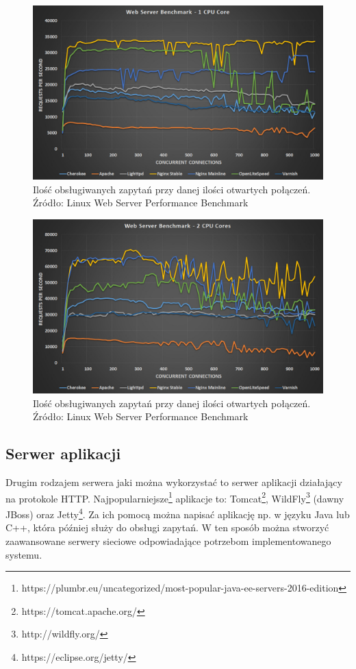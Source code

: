 \documentclass{report}
\begin{document}
			\begin{center}
				\begin{figure}[ht]
					\centering
					\includegraphics[scale=0.35]{web-server-performance-benchmark-1-cpu-core-1.jpg}
					\caption{Ilość obsługiwanych zapytań przy danej ilości otwartych połączeń. Źródło: Linux Web Server Performance Benchmark}
				\end{figure}
			\end{center}

			\begin{center}
				\begin{figure}[ht]
					\centering
					\includegraphics[scale=0.35]{web-server-performance-benchmark-2-cpu-cores-2.jpg}
					\caption{Ilość obsługiwanych zapytań przy danej ilości otwartych połączeń. Źródło: Linux Web Server Performance Benchmark}
				\end{figure}
			\end{center}
		
			\subsection{Serwer aplikacji}
			Drugim rodzajem serwera jaki można wykorzystać to serwer aplikacji działający na protokole HTTP. Najpopularniejsze\footnote{https://plumbr.eu/uncategorized/most-popular-java-ee-servers-2016-edition} aplikacje to: Tomcat\footnote{https://tomcat.apache.org/}, WildFly\footnote{http://wildfly.org/} (dawny JBoss) oraz Jetty\footnote{https://eclipse.org/jetty/}. Za ich pomocą można napisać aplikację np. w języku Java lub C++, która później służy do obsługi zapytań. W ten sposób można stworzyć zaawansowane serwery sieciowe odpowiadające potrzebom implementowanego systemu.
		
\end{document}
